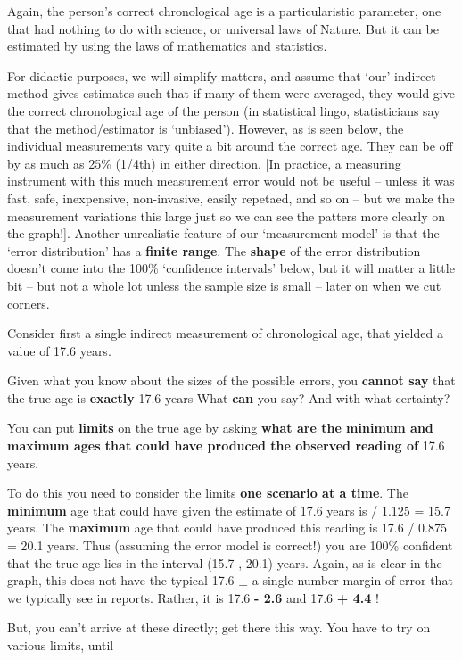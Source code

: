 \documentclass[]{book}
\begin{document}
Again, the person's correct chronological age is a particularistic parameter, one that had nothing to do with science, or universal laws of Nature. But it can be estimated by using the laws of mathematics and statistics.

For didactic purposes, we will simplify matters, and assume that `our' indirect method gives estimates such that if many of them were averaged, they would give the correct chronological age of the person (in statistical lingo, statisticians say that the method/estimator is `unbiased'). However, as is seen below, the individual measurements vary quite a bit around the correct age. They can be off by as much as 25\% (1/4th) in either direction. {[}In practice, a measuring instrument with this much measurement error would not be useful -- unless it was fast, safe, inexpensive, non-invasive, easily repetaed, and so on -- but we make the measurement variations this large just so we can see the patters more clearly on the graph!{]}. Another unrealistic feature of our `measurement model' is that the `error distribution' has a \textbf{finite range}. The \textbf{shape} of the error distribution doesn't come into the 100\% `confidence intervals' below, but it will matter a little bit -- but not a whole lot unless the sample size is small -- later on when we cut corners.

Consider first a single indirect measurement of chronological age, that yielded a value of 17.6 years.

Given what you know about the sizes of the possible errors, you \textbf{cannot say} that the true age is \textbf{exactly} 17.6 years What \textbf{can} you say? And with what certainty?

You can put \textbf{limits} on the true age by asking \textbf{what are the minimum and maximum ages that could have produced the observed reading of}
17.6 years.

To do this you need to consider the limits \textbf{one scenario at a time}. The \textbf{minimum} age that could have given the estimate of 17.6 years is /
1.125 =
15.7 years. The \textbf{maximum} age that could have produced this reading is
17.6 / 0.875 = 20.1 years. Thus (assuming the error model is correct!) you are 100\% confident that the true age lies in the interval (15.7 , 20.1) years. Again, as is clear in the graph, this does not have the typical
17.6 \(\pm\) a single-number margin of error that we typically see in reports. Rather, it is 17.6 \textbf{- 2.6} and 17.6 \textbf{+ 4.4} !

But, you can't arrive at these directly; get there this way. You have to try on various limits, until
\end{document}
